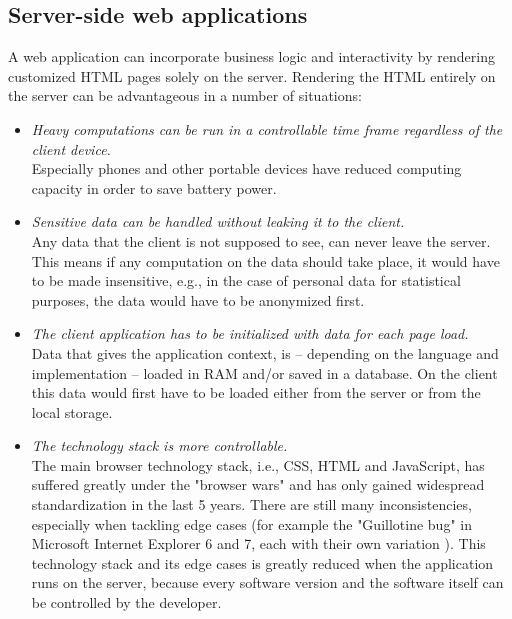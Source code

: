 \documentclass[thesis.tex]{subfiles}
\begin{document}
\subsection{Server-side web applications}
A web application can incorporate business logic  and
interactivity by rendering customized HTML pages solely on the server.
Rendering the HTML entirely on the server can be advantageous in a number of
situations:
\begin{itemize}
	\label{list:server-side-arguments}
	\item \emph{Heavy computations can be run in a controllable time frame
	regardless of the client device.}\\
		Especially phones and other portable devices have reduced computing
		capacity in order to save battery power.
	\item \emph{Sensitive data can be handled without leaking it to the
	client.}\\
		Any data that the client is not supposed to see, can never leave the
		server. This means if any computation on the data should take place,
		it would have to be made insensitive, e.g., in the case of personal data
		for statistical purposes, the data would have to be anonymized first.
	\item \emph{The client application has to be initialized with data for each
	page load.}\\
		Data that gives the application context, is -- depending on the language
		and implementation -- loaded in RAM and/or saved in a database. On the
		client this data would first have to be loaded either from the server or
		from the local storage.
	\item \emph{The technology stack is more controllable.}\\
		The main browser technology stack, i.e., CSS, HTML and JavaScript,
		has suffered greatly under the "browser wars" 
		and has only gained widespread standardization in the last 5 years.
		There are still many inconsistencies, especially when tackling edge cases
		(for example the "Guillotine bug" in Microsoft Internet Explorer 6 and 7,
		each with their own variation
		).
		This technology stack and its edge cases is greatly reduced when
		the application runs on the server, because every software version and
		the software itself can be controlled by the developer.
\end{itemize}
\end{document}
